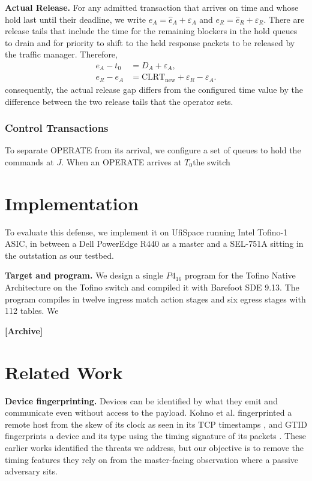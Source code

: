 \documentclass[conference]{IEEEtran}
\begin{document}
\textbf{Actual Release.} For any admitted transaction that arrives on time and whose hold last until their deadline, we write  $e_A=\hat{e}_A+\varepsilon_A$ and $e_R=\hat{e}_R+\varepsilon_R$. There are release tails that include  the time for the remaining blockers in the hold queues to drain and for priority to shift to the held response packets to be released by the traffic manager. Therefore,
\begin{equation}
\label{eq:released}
\begin{aligned}
e_A-t_0 &= D_A+\varepsilon_A,\\
e_R-e_A &= \mathrm{CLRT}_{\mathrm{new}}+\varepsilon_R-\varepsilon_A.
\end{aligned}
\end{equation}
consequently, the actual release gap differs from the configured time value by the difference between the two release tails that the operator sets.

\subsubsection{Control Transactions}
To separate OPERATE from its arrival, we configure a set of queues to hold the commands at $J$. When an OPERATE arrives at $T_0$the switch 





\section{Implementation}
To evaluate this defense, we implement it on  UfiSpace running Intel Tofino-1 ASIC, in between a Dell PowerEdge R440  as a master and a SEL-751A sitting in the outstation as our testbed.

\textbf{Target and program.} We design a single $P4_16$ program for the Tofino Native Architecture on the Tofino switch and compiled it with Barefoot SDE 9.13. The program compiles in twelve ingress match action stages and six egress stages with 112 tables. We
 
\textbf{[Archive]}\section{Related Work}
\textbf{Device fingerprinting.} Devices can be identified by what they emit and communicate even without access to the payload. Kohno et al. fingerprinted a remote host from the skew of its clock as seen in its TCP timestamps \cite{kohno2005}, and GTID fingerprints a device and its type using the timing signature of its packets  \cite{gtid2015}. These earlier works identified the threats we address, but our objective is to remove the timing features they rely on from the master-facing observation where a passive adversary sits.
\end{document}
